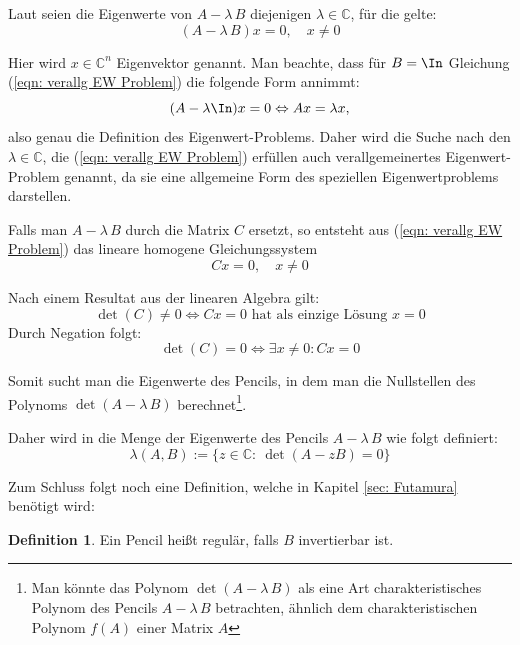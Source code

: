 \documentclass[a4paper,12pt]{report}
\newcommand{\C}{\mathbb C}
\newcommand{\AlamB}{A-\lambda\,B}
\theoremstyle{plain} %
\theoremstyle{definition} %
\newtheorem{definition}[theorem]{Definition}
\theoremstyle{remark}
\begin{document}
            Laut \cite[S. 375]{matrixGolub} seien die Eigenwerte von $\AlamB$ diejenigen $\lambda \in\C$, für die gelte:
            \begin{equation}
                  \label{eqn: verallg EW Problem}
                  (\AlamB)x=0,\quad x\ne 0
            \end{equation}
            
            Hier wird $x\in\C^n$ Eigenvektor genannt.
            Man beachte, dass für $B=\In$ Gleichung (\ref{eqn: verallg EW Problem}) die folgende Form annimmt:
            $$(A-\lambda\In)x=0 \Leftrightarrow Ax = \lambda x,$$
            also genau die Definition des Eigenwert-Problems.
            Daher wird die Suche nach den $\lambda\in\C$, die (\ref{eqn: verallg EW Problem}) erfüllen auch verallgemeinertes Eigenwert-Problem genannt, da sie eine allgemeine Form des speziellen Eigenwertproblems darstellen.

            Falls man $\AlamB$ durch die Matrix $C$ ersetzt, so entsteht aus (\ref{eqn: verallg EW Problem}) das lineare homogene Gleichungssystem
            $$Cx=0,\quad x\ne 0$$

            Nach einem Resultat aus der linearen Algebra gilt:
            $$\det(C)\ne 0 \Leftrightarrow Cx=0 \text{ hat als einzige Lösung }x=0$$
            Durch Negation folgt:
            $$\det(C)=0 \Leftrightarrow \exists x\ne 0: Cx=0$$

            Somit sucht man die Eigenwerte des Pencils, in dem man die Nullstellen des Polynoms $\det(\AlamB)$ berechnet\footnote{Man könnte das Polynom $\det(\AlamB)$ als eine Art charakteristisches Polynom des Pencils $\AlamB$ betrachten, ähnlich dem charakteristischen Polynom $f(A)$ einer Matrix $A$}.
            
            Daher wird in \cite[S. 375]{matrixGolub} die Menge der Eigenwerte des Pencils $\AlamB$ wie folgt definiert:
            \begin{equation}
                  \label{def: EW Pencil}
                  \lambda(A,B):=\{z\in\C:\ \det(A - zB) = 0\}
            \end{equation}

            Zum Schluss folgt noch eine Definition, welche in Kapitel \ref{sec: Futamura} benötigt wird:
            \begin{definition}
                  Ein Pencil heißt regulär, falls $B$ invertierbar ist.
            \end{definition}
\end{document}
